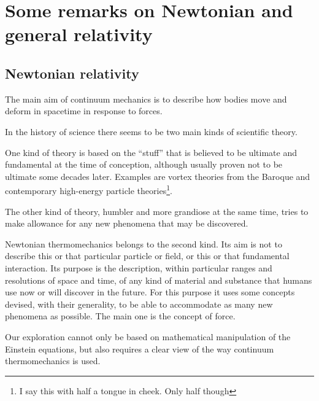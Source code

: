 \documentclass[\ifafour a4paper,12pt,\else a5paper,10pt,\fi%
onecolumn,oneside,article,%
british%
]{memoir}
\theoremstyle{remark}
\theoremstyle{innote}
\renewcommand*{\|}[1][]{\nonscript\,#1\vert\nonscript\;\mathopen{}}
\begin{document}
\section{Some remarks on Newtonian and general relativity}


\subsection{Newtonian relativity}
\label{sec:newtonian_mechanics_aim}

The main aim of continuum mechanics is to describe how bodies move and
deform in spacetime in response to forces. 

In the history of science there seems to be two main kinds of scientific
theory.

One kind of theory is based on the \enquote{stuff} that is believed to be
ultimate and fundamental at the time of conception, although usually proven
not to be ultimate some decades later. Examples are vortex theories from
the Baroque and contemporary high-energy particle theories\footnote{I say
  this with half a tongue in cheek. Only half though}.

The other kind of theory, humbler and more grandiose at the same time,
tries to make allowance for any new phenomena that may be discovered.

Newtonian thermomechanics belongs to the second kind. Its aim is not to
describe this or that particular particle or field, or this or that
fundamental interaction. Its purpose is the description, within particular
ranges and resolutions of space and time, of any kind of material and
substance that humans use now or will discover in the future. For this
purpose it uses some concepts devised, with their generality, to be able to
accommodate as many new phenomena as possible. The main one is the concept
of force.

Our exploration cannot only be based on mathematical manipulation of the
Einstein equations, but also requires a clear view of the way continuum
thermomechanics is used. %
\end{document}
